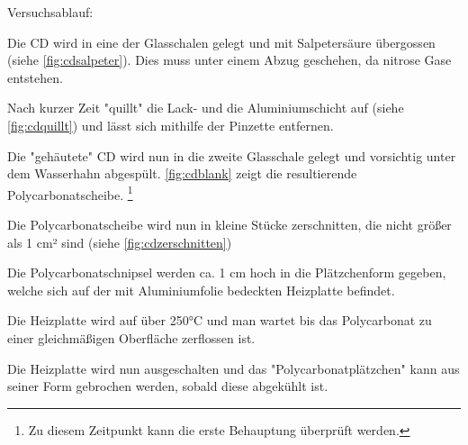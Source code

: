 Versuchsablauf:
\begin{enumerate*}
    \item Die CD wird in eine der Glasschalen gelegt und mit Salpetersäure übergossen (siehe \autoref{fig:cdsalpeter}). Dies muss unter einem Abzug geschehen, da nitrose Gase entstehen.
    \item Nach kurzer Zeit "quillt" die Lack- und die Aluminiumschicht auf (siehe \autoref{fig:cdquillt}) und lässt sich mithilfe der Pinzette entfernen.
    \item Die "gehäutete" CD wird nun in die zweite Glasschale gelegt und vorsichtig unter dem Wasserhahn abgespült. \autoref{fig:cdblank} zeigt die resultierende Polycarbonatscheibe. \footnote{Zu diesem Zeitpunkt kann die erste Behauptung überprüft werden.}
    \item Die Polycarbonatscheibe wird nun in kleine Stücke zerschnitten, die nicht größer als 1 cm² sind (siehe \autoref{fig:cdzerschnitten})
    \item Die Polycarbonatschnipsel werden ca. 1 cm hoch in die Plätzchenform gegeben, welche sich auf der mit Aluminiumfolie bedeckten Heizplatte befindet. %
    \item Die Heizplatte wird auf über 250°C und man wartet bis das Polycarbonat zu einer gleichmäßigen Oberfläche zerflossen ist.
    \item Die Heizplatte wird nun ausgeschalten und das "Polycarbonatplätzchen" kann aus seiner Form gebrochen werden, sobald diese abgekühlt ist. %
\end{enumerate*}

